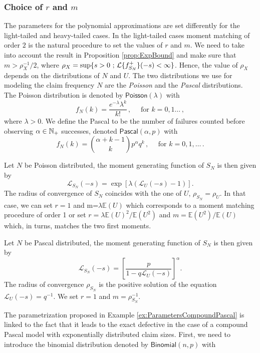 \subsubsection{Choice of $r$ and $m$}\label{ssec:ChoosingmAndr}
The parameters for the polynomial approximations are set differently for the light-tailed and heavy-tailed cases. In the light-tailed cases moment matching of order $2$ is the natural procedure to set the values of $r$ and $m$. We need to take into account the result in Proposition \ref{prop:ExpBound} and make sure that $m>\rho_X^{-1}/2$, where $\rho_X=\sup\{s>0\text{ ; }\mathcal{L}\{f_{S_N}^{+}\}(-s)<\infty\}$. Hence, the value of $\rho_X$ depends on the distributions of $N$ and $U$. The two distributions we use for modeling the claim frequency $N$ are the \emph{Poisson} and the \emph{Pascal} distributions. The Poisson distribution is denoted by $\mathsf{Poisson}(\lambda)$ with \pmf
\[ f_N(k) = \frac{e^{-\lambda}\lambda^{k}}{k!} \,, \quad \text{ for }k = 0,1\dots \,, \]
where $\lambda>0 $. We define the Pascal \rv to be the number of failures counted before observing $\alpha \in \mathbb{N}_+$ successes, denoted $\mathsf{Pascal}(\alpha,p)$ with \pmf
\[ f_N(k) = \binom{\alpha+k-1}{k} p^\alpha q^k \,, \quad \text{ for } k = 0,1,\dots \,. \]
\begin{example}\label{ex:ParametersCompoundPoisson}
Let $N$ be Poisson distributed, the moment generating function of $S_N$ is then given by
$$
\mathcal{L}_{S_N}(-s)=\exp\left[\lambda(\mathcal{L}_U(-s)-1)\right].
$$
The radius of convergence of $S_N$ coincides with the one of $U$, $\rho_{S_N}=\rho_U$. In  that case, we can set $r=1$ and m=$\lambda\mathbb{E}(U)$ which corresponds to a moment matching procedure of order 1 or set $r=\lambda\mathbb{E}(U)^{2}/\mathbb{E}\left(U^{2}\right)$ and $m=\mathbb{E}\left(U^{2}\right)/\mathbb{E}(U)$ which, in turns, matches the two first moments.
\end{example}
\begin{example}\label{ex:ParametersCompoundPascal}
Let $N$ be Pascal distributed, the moment generating function of $S_N$ is then given by
$$
\mathcal{L}_{S_N}(-s)=\left[\frac{p}{1-q\mathcal{L}_U(-s)}\right]^{\alpha}.
$$
The radius of convergence $\rho_{S_N}$ is the positive solution of the equation $\mathcal{L}_U(-s)=q^{-1}$. We set $r=1$ and $m=\rho_{S_N}^{-1}$.
\end{example}
The parametrization proposed in Example \ref{ex:ParametersCompoundPascal} is linked to the fact that it leads to the exact defective \pdf in the case of a compound Pascal model with exponentially distributed claim sizes. First, we need to introduce the binomial distribution denoted by $\mathsf{Binomial}(n,p)$ with \pmf
